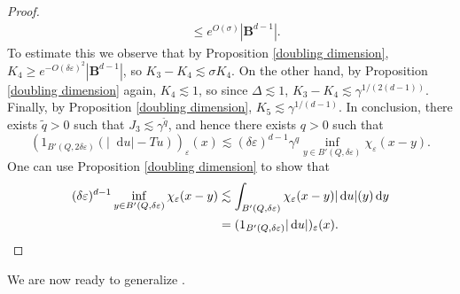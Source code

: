 \documentclass[reqno,12pt,letterpaper]{amsart}
\newcommand{\Ball}{\mathbf{B}}
\newcommand*\dif{\mathop{}\!\mathrm{d}}
\theoremstyle{definition}
\numberwithin{equation}{section}
\begin{document}
\begin{proof}
\begin{align*}
&\leq e^{O(\sigma)} |\Ball^{d - 1}|.
\end{align*}
To estimate this we observe that by Proposition \ref{doubling dimension}, $K_4 \geq e^{-O(\delta\varepsilon)^2}| \Ball^{d - 1}|$, so $K_3 - K_4 \lesssim \sigma K_4$.
On the other hand, by Proposition \ref{doubling dimension} again, $K_4 \lesssim 1$, so since $\Delta \lesssim 1$, $K_3 - K_4 \lesssim \gamma^{1/(2(d - 1))}$.
Finally, by Proposition \ref{doubling dimension}, $K_5 \lesssim \gamma^{1/(d - 1)}$.
In conclusion, there exists $\tilde q > 0$ such that $J_3 \lesssim \gamma^{\tilde q}$, and hence there exists $q > 0$ such that
$$(1_{B'(Q, 2\delta\varepsilon)}(|\dif u| - Tu))_\varepsilon(x) \lesssim (\delta\varepsilon)^{d - 1} \gamma^q \inf_{y \in B'(Q, \delta\varepsilon)} \chi_\varepsilon(x - y).$$
One can use Proposition \ref{doubling dimension} to show that
\begin{align*}
(\delta\varepsilon)^{d - 1} \inf_{y \in B'(Q, \delta\varepsilon)} \chi_\varepsilon(x - y) &\lesssim \int_{B'(Q, \delta\varepsilon)} \chi_\varepsilon(x - y) |\dif u|(y) \dif y \\
&= (1_{B'(Q, \delta\varepsilon)} |\dif u|)_\varepsilon(x). \qedhere
\end{align*}
\end{proof}

We are now ready to generalize \cite[Theorem 7.3]{Giusti77}.
\end{document}
